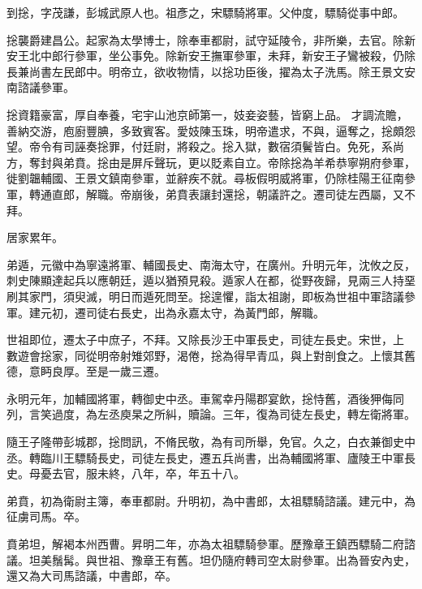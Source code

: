 
\begin{pinyinscope}

 到捴，字茂謙，彭城武原人也。祖彥之，宋驃騎將軍。父仲度，驃騎從事中郎。



 捴襲爵建昌公。起家為太學博士，除奉車都尉，試守延陵令，非所樂，去官。除新安王北中郎行參軍，坐公事免。除新安王撫軍參軍，未拜，新安王子鸞被殺，仍除長兼尚書左民郎中。明帝立，欲收物情，以捴功臣後，擢為太子洗馬。除王景文安南諮議參軍。



 捴資籍豪富，厚自奉養，宅宇山池京師第一，妓妾姿藝，皆窮上品。
 才調流贍，善納交游，庖廚豐腆，多致賓客。愛妓陳玉珠，明帝遣求，不與，逼奪之，捴頗怨望。帝令有司誣奏捴罪，付廷尉，將殺之。捴入獄，數宿須鬢皆白。免死，系尚方，奪封與弟賁。捴由是屏斥聲玩，更以貶素自立。帝除捴為羊希恭寧朔府參軍，徙劉韞輔國、王景文鎮南參軍，並辭疾不就。尋板假明威將軍，仍除桂陽王征南參軍，轉通直郎，解職。帝崩後，弟賁表讓封還捴，朝議許之。遷司徒左西屬，又不拜。



 居家累年。



 弟遁，元徽中為寧遠將軍、輔國長史、南海太守，在廣州。升明元年，沈攸之反，刺史陳顯達起兵以應朝廷，遁以猶預見殺。遁家人在都，從野夜歸，見兩三人持堊刷其家門，須臾滅，明日而遁死問至。捴遑懼，詣太祖謝，即板為世祖中軍諮議參軍。建元初，遷司徒右長史，出為永嘉太守，為黃門郎，解職。



 世祖即位，遷太子中庶子，不拜。又除長沙王中軍長史，司徒左長史。宋世，上
 數遊會捴家，同從明帝射雉郊野，渴倦，捴為得早青瓜，與上對剖食之。上懷其舊德，意眄良厚。至是一歲三遷。



 永明元年，加輔國將軍，轉御史中丞。車駕幸丹陽郡宴飲，捴恃舊，酒後狎侮同列，言笑過度，為左丞庾杲之所糾，贖論。三年，復為司徒左長史，轉左衛將軍。



 隨王子隆帶彭城郡，捴問訊，不脩民敬，為有司所舉，免官。久之，白衣兼御史中丞。轉臨川王驃騎長史，司徒左長史，遷五兵尚書，出為輔國將軍、廬陵王中軍長史。母憂去官，服未終，八年，卒，年五十八。



 弟賁，初為衛尉主簿，奉車都尉。升明初，為中書郎，太祖驃騎諮議。建元中，為征虜司馬。卒。



 賁弟坦，解褐本州西曹。昇明二年，亦為太祖驃騎參軍。歷豫章王鎮西驃騎二府諮議。坦美鬚髯。與世祖、豫章王有舊。坦仍隨府轉司空太尉參軍。出為晉安內史，還又為大司馬諮議，中書郎，卒。




\end{pinyinscope}
